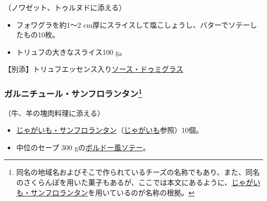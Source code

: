 \begin{recette}


（ノワゼット、トゥルヌドに添える）

\begin{itemize}
\item
  フォワグラを約1〜2
  cm厚にスライスして塩こしょうし、バターでソテーしたもの10枚。
\item
  トリュフの大きなスライス100 g。
\end{itemize}

【別添】トリュフエッセンス入り\protect\hyperlink{sauce-demi-glace}{ソース・ドゥミグラス}

\atoaki{}

\hypertarget{garniture-saint-florentin}{%
\subsubsection[ガルニチュール・サンフロランタン]{\texorpdfstring{ガルニチュール・サンフロランタン\footnote{同名の地域名およびそこで作られているチーズの名称でもあり、また、同名のさくらんぼを用いた菓子もあるが、ここでは本文にあるように、\protect\hyperlink{pommes-de-terre-saint-florentin}{じゃがいも・サンフロランタン}を用いているのが名称の根拠。}}{ガルニチュール・サンフロランタン}}\label{garniture-saint-florentin}}



（牛、羊の塊肉料理に添える）

\begin{itemize}
\item
  \protect\hyperlink{pommes-de-terre-saint-florentin}{じゃがいも・サンフロランタン}（\protect\hyperlink{pommes-de-terre}{じゃがいも}参照）10個。
\item
  中位のセープ 300
  gの\protect\hyperlink{cepes-bordelaise}{ボルドー風ソテー}。
\end{itemize}


\end{recette}
